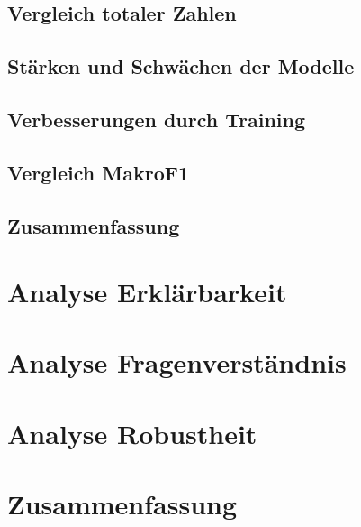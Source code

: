 \subsection{Vergleich totaler Zahlen}
\subsection{Stärken und Schwächen der Modelle}
\subsection{Verbesserungen durch Training}
\subsection{Vergleich MakroF1}
\subsection{Zusammenfassung}
\section{Analyse Erklärbarkeit}\label{sec:results:explainability}
\section{Analyse Fragenverständnis}\label{sec:results:questionunderstanding}
\section{Analyse Robustheit}\label{sec:results:robustness}
\section{Zusammenfassung}\label{sec:results:summary}


